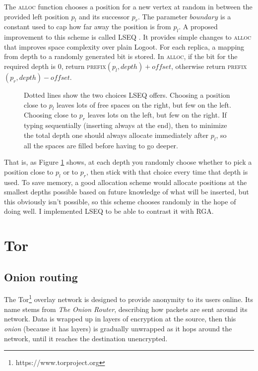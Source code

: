 \documentclass[diss.tex]{subfiles}
\begin{document}
The \textsc{alloc} function chooses a position for a new vertex at random in between the provided left position $p_l$ and its successor $p_r$. The parameter $boundary$ is a constant used to cap how far away the position is from $p_l$. 
A proposed improvement to this scheme is called LSEQ \cite{lseq}. It provides simple changes to \textsc{alloc} that improves space complexity over plain Logoot. For each replica, a mapping from depth to a randomly generated bit is stored. In \textsc{alloc}, if the bit for the required depth is 0, return \textsc{prefix}$(p_l, depth) + o\!f\!f\!set$, otherwise return \textsc{prefix}$(p_r, depth) - o\!f\!f\!set$.
\begin{figure}[H]
\centering
{}
\caption{Dotted lines show the two choices LSEQ offers. Choosing a position close to $p_l$ leaves lots of free spaces on the right, but few on the left. Choosing close to $p_r$ leaves lots on the left, but few on the right. If typing sequentially (inserting always at the end), then to minimize the total depth one should always allocate immediately after $p_l$, so all the spaces are filled before having to go deeper.}
\label{fig:lseqalloc}
\end{figure}
That is, as Figure \ref{fig:lseqalloc} shows, at each depth you randomly choose whether to pick a position close to $p_l$ or to $p_r$, then stick with that choice every time that depth is used. To save memory, a good allocation scheme would allocate positions at the smallest depths possible based on future knowledge of what will be inserted, but this obviously isn't possible, so this scheme chooses randomly in the hope of doing well. I implemented LSEQ to be able to contrast it with RGA.
%
%
%
%
%
%
%
%
%
%


\section{Tor}
\subsection{Onion routing}
The Tor\footnote{https://www.torproject.org} \cite{torpaper} overlay network is designed to provide anonymity to its users online. Its name stems from \textit{The Onion Router}, describing how packets are sent around its network. Data is wrapped up in layers of encryption at the source, then this \textit{onion} (because it has layers) is gradually unwrapped as it hops around the network, until it reaches the destination unencrypted.
\end{document}
